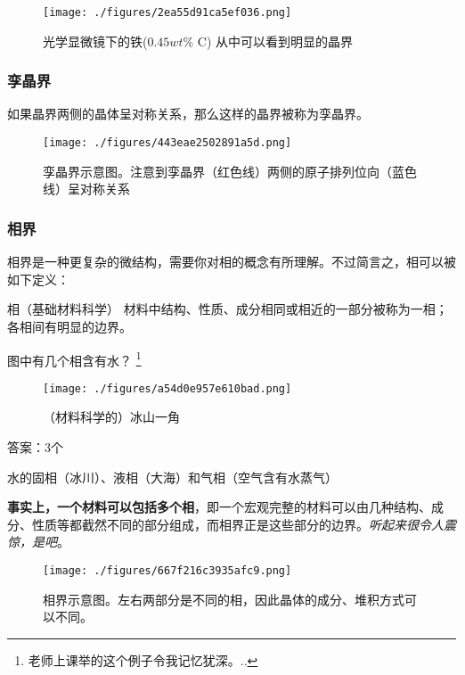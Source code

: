 \begin{figure}[ht]
\centering
\texttt{[image: ./figures/2ea55d91ca5ef036.png]}
\caption{光学显微镜下的铁($0.45 wt\%$ C) 从中可以看到明显的晶界} \label{fig_MetInt_13}
\end{figure}

\subsubsection{孪晶界}
如果晶界两侧的晶体呈对称关系，那么这样的晶界被称为孪晶界。
\begin{figure}[ht]
\centering
\texttt{[image: ./figures/443eae2502891a5d.png]}
\caption{孪晶界示意图。注意到孪晶界（红色线）两侧的原子排列位向（蓝色线）呈对称关系} \label{fig_MetInt_12}
\end{figure}

\subsubsection{相界}
相界是一种更复杂的微结构，需要你对相的概念有所理解。不过简言之，相可以被如下定义：
\begin{definition}{相（基础材料科学）}
材料中结构、性质、成分相同或相近的一部分被称为一相；各相间有明显的边界。
\end{definition}

\begin{example}{图中有几个相含有水？}
\footnote{老师上课举的这个例子令我记忆犹深。..}
\begin{figure}[ht]
\centering
\texttt{[image: ./figures/a54d0e957e610bad.png]}
\caption{（材料科学的）冰山一角} \label{fig_MetInt_14}
\end{figure}
答案：3个

水的固相（冰川）、液相（大海）和气相（空气含有水蒸气）
\end{example}

\textbf{事实上，一个材料可以包括多个相}，即一个宏观完整的材料可以由几种结构、成分、性质等都截然不同的部分组成，而相界正是这些部分的边界。\textsl{听起来很令人震惊，是吧}。
\begin{figure}[ht]
\centering
\texttt{[image: ./figures/667f216c3935afc9.png]}
\caption{相界示意图。左右两部分是不同的相，因此晶体的成分、堆积方式可以不同。} \label{fig_MetInt_22}
\end{figure}

